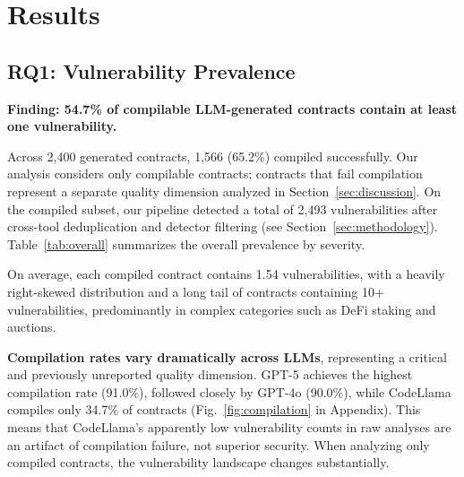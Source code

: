 \section{Results}
\label{sec:results}

\subsection{RQ1: Vulnerability Prevalence}

\textbf{Finding: 54.7\% of compilable LLM-generated contracts contain at least one vulnerability.}

Across 2,400 generated contracts, 1,566 (65.2\%) compiled successfully. Our analysis considers only compilable contracts; contracts that fail compilation represent a separate quality dimension analyzed in Section~\ref{sec:discussion}. On the compiled subset, our pipeline detected a total of 2,493 vulnerabilities after cross-tool deduplication and detector filtering (see Section~\ref{sec:methodology}). Table~\ref{tab:overall} summarizes the overall prevalence by severity.

\begin{table}[t]
\caption{Vulnerability Prevalence ($n=1{,}566$ compiled)}
\label{tab:overall}
\centering
{}
\end{table}

On average, each compiled contract contains 1.54 vulnerabilities, with a heavily right-skewed distribution and a long tail of contracts containing 10+ vulnerabilities, predominantly in complex categories such as DeFi staking and auctions.

\textbf{Compilation rates vary dramatically across LLMs}, representing a critical and previously unreported quality dimension. GPT-5 achieves the highest compilation rate (91.0\%), followed closely by GPT-4o (90.0\%), while CodeLlama compiles only 34.7\% of contracts (Fig.~\ref{fig:compilation} in Appendix). This means that CodeLlama's apparently low vulnerability counts in raw analyses are an artifact of compilation failure, not superior security. When analyzing only compiled contracts, the vulnerability landscape changes substantially.

